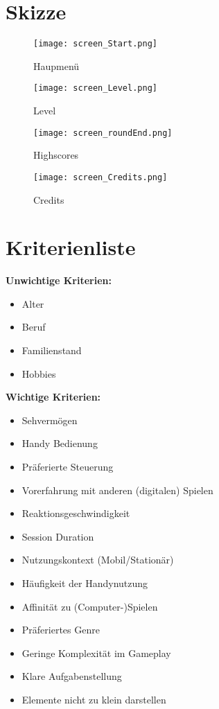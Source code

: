 \documentclass[12pt, a4paper]{article}
\begin{document}
\section{Skizze}


\begin{figure}[H]
\centering
\begin{minipage}{.5\textwidth}
\centering
\texttt{[image: screen\_Start.png]}
\caption{Haupmenü}
\label{fig:Haupmenü}
\end{minipage}%
\begin{minipage}{.5\textwidth}
\centering
\texttt{[image: screen\_Level.png]}
\caption{Level}
\label{fig:Level}
\end{minipage}
\end{figure}


\begin{figure}[H]
\centering
\begin{minipage}{.5\textwidth}
\centering
\texttt{[image: screen\_roundEnd.png]}
\caption{Highscores}
\label{fig:Highscores}    
\end{minipage}%
\begin{minipage}{.5\textwidth}
\centering
\texttt{[image: screen\_Credits.png]}
\caption{Credits}
\label{fig:Credits}
\end{minipage}
\end{figure}

\newpage
\section{Kriterienliste}
\textbf{Unwichtige Kriterien:}
\begin{itemize}
    \item Alter
    \item Beruf
    \item Familienstand
    \item Hobbies
\end{itemize}

\par\bigskip
\begin{flushleft}
\textbf{Wichtige Kriterien:}
\end{flushleft}
\begin{itemize}
    \item Sehvermögen
    \item Handy Bedienung
    \item Präferierte Steuerung
    \item Vorerfahrung mit anderen (digitalen) Spielen
    \item Reaktionsgeschwindigkeit
    \item Session Duration
    \item Nutzungskontext (Mobil/Stationär)
    \item Häufigkeit der Handynutzung
    \item Affinität zu (Computer-)Spielen
    \item Präferiertes Genre
    \item Geringe Komplexität im Gameplay
    \item Klare Aufgabenstellung
    \item Elemente nicht zu klein darstellen
\end{itemize}
\end{document}
